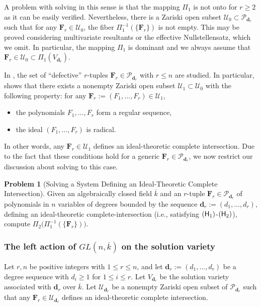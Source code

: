 \documentclass[pdflatex,sn-basic]{sn-jnl}%
\theoremstyle{thmstyleone}%
\theoremstyle{thmstyletwo}%
\theoremstyle{thmstylethree}%
\theoremstyle{definition}
\newtheorem{problem}[theorem]{Problem}
\numberwithin{equation}{section}
\newcommand{\bfs}{\boldsymbol}
\begin{document}
A problem with solving in this sense is that the mapping $\Pi_1$ is
not onto for $r\ge 2$ as it can be easily verified. Nevertheless,
there is a Zariski open subset
$\mathcal{U}_0\subset\mathcal{P}_{\bfs d_r}$ such that for any $\bfs
F_r\in \mathcal{U}_0$, the fiber $\Pi_1^{-1}(\{\bfs F_r\})$ is not
empty. This may be proved considering multivariate resultants or the
effective Nullstellensatz, which we omit. In particular, the mapping
$\Pi_1$ is dominant and we always assume that $\bfs F_r\in
\mathcal{U}_0\subset\Pi_1(V_{\bfs d_r})$.

In \cite{GiMaPePr23}, the set of ``defective'' $r$-tuples $\bfs
F_r\in \mathcal{P}_{\bfs d_r}$ with $r\le n$ are studied. In
particular, \cite[Theorem 3.6]{GiMaPePr23} shows that there exists a
nonempty Zariski open subset $\mathcal{U}_1\subset \mathcal{U}_0$
with the following property: for any $\bfs F_r:=(F_1,\ldots,F_r)\in
\mathcal{U}_1$,
%
\begin{itemize}
  \item[$({\sf H}_1)$] the polynomials $F_1,\ldots,F_r$ form a regular sequence,
  \item[$({\sf H}_2)$] the ideal $(F_1,\ldots,F_r)$ is radical.
\end{itemize}
%
In other words, any $\bfs F_r\in\mathcal{U}_1$ defines an
ideal-theoretic complete intersection. Due to the fact that these
conditions hold for a generic $\bfs F_r\in\mathcal{P}_{\bfs d_r}$,
we now restrict our discussion about solving to this case.
%
\begin{problem}[Solving a System Defining an Ideal-Theoretic Complete Intersection]
Given an algebraically closed field $\overline{k}$ and an $r$-tuple
$\bfs F_r\in\mathcal{P}_{\bfs d_r}$ of polynomials in $n$ variables
of degrees bounded by the sequence $\bfs d_r:=(d_1,\ldots,d_r)$,
defining an ideal-theoretic complete-intersection (i.e., satisfying
$({\sf H}_1)$-$({\sf H}_2)$), compute $\Pi_2\big(\Pi_1^{-1}(\{\bfs
F_r\})\big)$.
\end{problem}
%
%
\subsubsection{The left action of $GL(n,\overline{k})$ on the solution
variety}
\label{subsec: left action GL}
%
Let $r,n$ be positive integers with $1\le r\le n$, and let $\bfs
d_r:=(d_1,\ldots,d_r)$ be a degree sequence with $d_i\ge 1$ for
$1\le i\le r$. Let $V_{\bfs d_r}$ be the solution variety associated
with $\bfs d_r$ over $\overline{k}$. Let $\mathcal{U}_{\bfs d_r}$ be
a nonempty Zariski open subset of $\mathcal{P}_{\bfs d_r}$ such that
any $\bfs F_r\in\mathcal{U}_{\bfs d_r}$ defines an ideal-theoretic
complete intersection.
\end{document}
